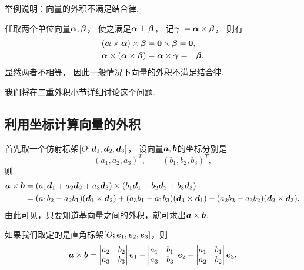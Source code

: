 \begin{example}\label{example:向量的外积.向量的外积不满足结合律}
举例说明：向量的外积不满足结合律.
\begin{solution}
任取两个单位向量\(\boldsymbol\alpha,\boldsymbol\beta\)，
使之满足\(\boldsymbol\alpha \perp \boldsymbol\beta\)，
记\(\boldsymbol\gamma := \boldsymbol\alpha\times\boldsymbol\beta\)，
则有\begin{align*}
	(\boldsymbol\alpha\times\boldsymbol\alpha)\times\boldsymbol\beta
	&= \boldsymbol0\times\boldsymbol\beta
	= \boldsymbol0, \\
	\boldsymbol\alpha\times(\boldsymbol\alpha\times\boldsymbol\beta)
	&= \boldsymbol\alpha\times\boldsymbol\gamma
	= -\boldsymbol\beta.
\end{align*}
显然两者不相等，
因此一般情况下向量的外积不满足结合律.
\end{solution}
\end{example}

我们将在{二重外积}小节详细讨论这个问题.

\subsection{利用坐标计算向量的外积}
首先取一个仿射标架\([O;\boldsymbol{d}_1,\boldsymbol{d}_2,\boldsymbol{d}_3]\)，
设向量\(\boldsymbol{a},\boldsymbol{b}\)的坐标分别是\begin{equation*}
	(a_1,a_2,a_3)^T, \qquad
	(b_1,b_2,b_3)^T,
\end{equation*}
则\begin{equation}
	\begin{split}
		\boldsymbol{a}\times\boldsymbol{b}
		&= (a_1 \boldsymbol{d}_1 + a_2 \boldsymbol{d}_2 + a_3 \boldsymbol{d}_3)\times(b_1 \boldsymbol{d}_1 + b_2 \boldsymbol{d}_2 + b_3 \boldsymbol{d}_3) \\
		&= (a_1 b_2 - a_2 b_1) (\boldsymbol{d}_1\times\boldsymbol{d}_2)
		+ (a_3 b_1 - a_1 b_3) (\boldsymbol{d}_3\times\boldsymbol{d}_1)
		+ (a_2 b_3 - a_3 b_2) (\boldsymbol{d}_2\times\boldsymbol{d}_3).
	\end{split}
\end{equation}
由此可见，只要知道基向量之间的外积，就可求出\(\boldsymbol{a}\times\boldsymbol{b}\).

如果我们取定的是直角标架\([O;\boldsymbol{e}_1,\boldsymbol{e}_2,\boldsymbol{e}_3]\)，则
\begin{equation}
	\boldsymbol{a}\times\boldsymbol{b}
	= \begin{vmatrix}
		a_2 & b_2 \\
		a_3 & b_3
	\end{vmatrix}
	\boldsymbol{e}_1
	- \begin{vmatrix}
		a_1 & b_1 \\
		a_3 & b_3
	\end{vmatrix}
	\boldsymbol{e}_2
	+ \begin{vmatrix}
		a_1 & b_1 \\
		a_2 & b_2
	\end{vmatrix}
	\boldsymbol{e}_3.
\end{equation}

